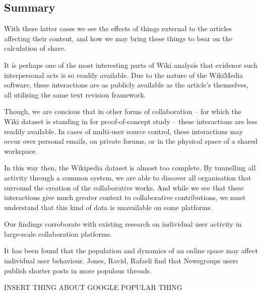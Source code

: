 \subsection*{Summary}
With these latter cases we see the effects of things external to the
articles affecting their content, and how we may bring these things to
bear on the calculation of share. 

It is perhaps one of the most interesting parts of Wiki analysis that
evidence such interpersonal acts is so readily available. Due to the
nature of the WikiMedia software, these interactions are as publicly
available as the article's themselves, all utilising the same text
revision framework. 

Though, we are concious that in other forms of collaboration -- for
which the Wiki dataset is standing in for proof-of-concept study --
these interactions are less readily available. In cases of multi-user
source control, these interactions may occur over personal emails, on
private forums, or in the physical space of a shared workspace.

In this way then, the Wikipedia dataset is almost too complete. By
tunnelling all activity through a common system, we are able to
discover all organisation that surround the creation of the
collaborative works. And while we see that these interactions give
much greater context to collaborative contributions, we must
understand that this kind of data is unavailable on some platforms.

Our findings corroborate with existing research on individual user
activity in large-scale collaboration platforms. 

It has been found that the population and dynamics of an online space
may affect individual user behaviour. Jones, Ravid, Rafaeli find that
Newsgroups users publish shorter posts in more populous threads.

INSERT THING ABOUT GOOGLE POPULAR THING






